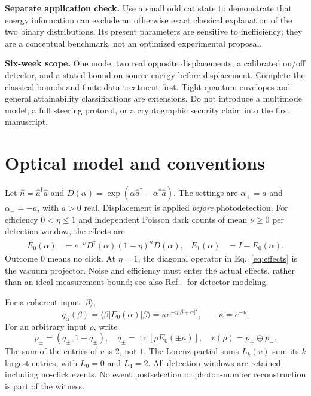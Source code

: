 \documentclass[11pt,a4paper]{article}
\newcommand{\tr}{\operatorname{tr}}
\newcommand{\ket}[1]{\lvert #1\rangle}
\newcommand{\bra}[1]{\langle #1\rvert}
\newcommand{\abs}[1]{\lvert #1\rvert}
\newcommand{\I}{I}
\begin{document}
\textbf{Separate application check.} Use a small odd cat state to demonstrate that
energy information can exclude an otherwise exact classical explanation of the
two binary distributions. Its present parameters are sensitive to inefficiency;
they are a conceptual benchmark, not an optimized experimental proposal.

\textbf{Six-week scope.} One mode, two real opposite displacements, a calibrated
on/off detector, and a stated bound on source energy before displacement. Complete
the classical bounds and finite-data treatment first. Tight quantum envelopes and
general attainability classifications are extensions. Do not introduce a
multimode model, a full steering protocol, or a cryptographic security claim into
the first manuscript.

\section{Optical model and conventions}
Let $\hat n=\hat a^\dagger\hat a$ and
$D(\alpha)=\exp(\alpha\hat a^\dagger-\alpha^*\hat a)$.
The settings are $\alpha_+=a$ and $\alpha_-=-a$, with $a>0$ real.
Displacement is applied \emph{before} photodetection. For efficiency
$0<\eta\leq1$ and independent Poisson dark counts of mean $\nu\geq0$ per
detection window, the effects are
\begin{align}
 E_0(\alpha)&=e^{-\nu}D^\dagger(\alpha)(1-\eta)^{\hat n}D(\alpha),
 &E_1(\alpha)&=\I-E_0(\alpha). \label{eq:effects}
\end{align}
Outcome $0$ means no click. At $\eta=1$, the diagonal operator in
Eq.~\eqref{eq:effects} is the vacuum projector. Noise and efficiency must enter
the actual effects, rather than an ideal measurement bound; see also
Ref.~\cite{Sperling2012} for detector modeling.

For a coherent input $\ket\beta$,
\begin{equation}
 q_\alpha(\beta)=\bra\beta E_0(\alpha)\ket\beta
 =\kappa e^{-\eta\abs{\beta+\alpha}^2},\qquad \kappa=e^{-\nu}.
 \label{eq:coherent}
\end{equation}
For an arbitrary input $\rho$, write
\begin{equation}
 p_\pm=(q_\pm,1-q_\pm),\quad
 q_\pm=\tr[\rho E_0(\pm a)],\quad
 v(\rho)=p_+\oplus p_-.
 \label{eq:v}
\end{equation}
The sum of the entries of $v$ is $2$, not $1$. The Lorenz partial sums
$L_k(v)$ sum its $k$ largest entries, with $L_0=0$ and $L_4=2$.
All detection windows are retained, including no-click events. No event
postselection or photon-number reconstruction is part of the witness.
\end{document}
